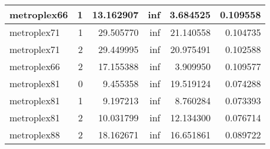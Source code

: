 \begin{longtable}{|l|r|r|r|r|r|}
metroplex66 & 1 & 13.162907 & inf & 3.684525 & 0.109558 \\\hline
metroplex71 & 1 & 29.505770 & inf & 21.140558 & 0.104735 \\\hline
metroplex71 & 2 & 29.449995 & inf & 20.975491 & 0.102588 \\\hline
metroplex66 & 2 & 17.155388 & inf & 3.909950 & 0.109577 \\\hline
metroplex81 & 0 & 9.455358 & inf & 19.519124 & 0.074288 \\\hline
metroplex81 & 1 & 9.197213 & inf & 8.760284 & 0.073393 \\\hline
metroplex81 & 2 & 10.031799 & inf & 12.134300 & 0.076714 \\\hline
metroplex88 & 2 & 18.162671 & inf & 16.651861 & 0.089722 \\\hline
\end{longtable}
